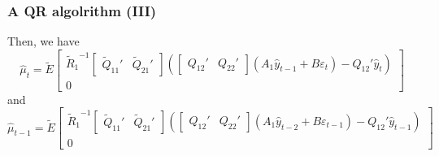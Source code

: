 \documentclass{beamer}
\begin{document}
\begin{frame}
  \frametitle{A QR algolrithm (III)}
Then, we have
{\footnotesize
\[
\widehat\mu_t = \widetilde E\left[\begin{array}{c}{\widetilde R_1}^{-1}\left[
  \begin{array}{cc}
  \widetilde Q_{11}' & \widetilde Q_{21}'  
  \end{array}\right]\left(\left[
      \begin{array}{cc}Q_{12}' & Q_{22}'\end{array}\right]\left(A_1 \widehat y_{t-1}+B\varepsilon_t\right)-Q_{12}'\widehat y_t\right)\\0\end{array}\right]
\]
}
and
{\footnotesize
\[
\widehat\mu_{t-1} = \widetilde E\left[\begin{array}{c}{\widetilde R_1}^{-1}\left[
  \begin{array}{cc}
  \widetilde Q_{11}' & \widetilde Q_{21}'  
  \end{array}\right]\left(\left[
      \begin{array}{cc}Q_{12}' & Q_{22}'\end{array}\right]\left(A_1 \widehat y_{t-2}+B\varepsilon_{t-1}\right)-Q_{12}'\widehat y_{t-1}\right)\\0\end{array}\right]
\]
}
\end{frame}
\end{document}
